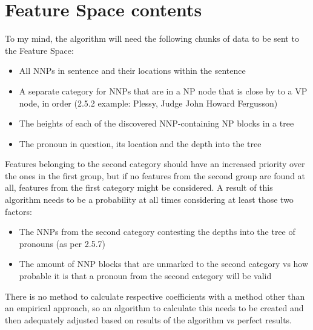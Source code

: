 \documentclass{article}
\begin{document}
\section{Feature Space contents} \label{Feature Space}
To my mind, the algorithm will need the following chunks of data to be sent to the Feature Space:
\begin{itemize}
    \item All NNPs in sentence and their locations within the sentence
    \item A separate category for NNPs that are in a NP node that is close by to a VP node, in order (2.5.2 example: Plessy, Judge John Howard Fergusson)
    \item The heights of each of the discovered NNP-containing NP blocks in a tree
    \item The pronoun in question, its location and the depth into the tree
\end{itemize}
Features belonging to the second category should have an increased priority over the ones in the first group, but if no features from the second group are found at all, features from the first category might be considered. A result of this algorithm needs to be a probability at all times considering at least those two factors:
\begin{itemize}
    \item The NNPs from the second category contesting the depths into the tree of pronouns (as per 2.5.7)
    \item The amount of NNP blocks that are unmarked to the second category vs how probable it is that a pronoun from the second category will be valid
\end{itemize}
There is no method to calculate respective coefficients with a method other than an empirical approach, so an algorithm to calculate this needs to be created and then adequately adjusted based on results of the algorithm vs perfect results.
\end{document}
